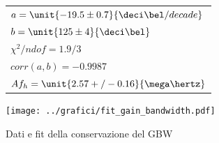 \documentclass[10pt,a4paper]{article}
\begin{document}
\begin{figure}[H]
	\begin{minipage}{0.28\textwidth}
		\centering
		\begin{tabular}{l}
			$a = \unit{-19.5 \pm 0.7}{\deci\bel / decade}$ \\
			$b = \unit{125 \pm 4}{\deci \bel}$ \\
			$\chi^2 / ndof = 1.9/3$\\
			$corr(a,b) = -0.9987$\\
			$Af_h = \unit{2.57+/-0.16}{\mega\hertz}$
		\end{tabular}
	\end{minipage}
	\begin{minipage}{0.75\textwidth}
		\centering
		\texttt{[image: ../grafici/fit\_gain\_bandwidth.pdf]}
		\caption{Dati e fit della conservazione del GBW}
		\label{}
	\end{minipage}
\end{figure}
\end{document}
